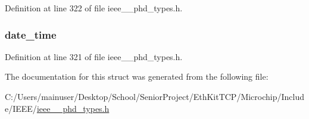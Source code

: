 Definition at line 322 of file ieee\+\_\+\_\+phd\+\_\+types.\+h.

\hypertarget{struct___set_time_invoke_a5220206765d190357de8a2604af4c4f4}{}
\subsubsection[{date\+\_\+time}]{ date\+\_\+time}\label{struct___set_time_invoke_a5220206765d190357de8a2604af4c4f4}


Definition at line 321 of file ieee\+\_\+\_\+phd\+\_\+types.\+h.



The documentation for this struct was generated from the following file\+:\begin{DoxyCompactItemize}
\item 
C\+:/\+Users/mainuser/\+Desktop/\+School/\+Senior\+Project/\+Eth\+Kit\+T\+C\+P/\+Microchip/\+Include/\+I\+E\+E\+E/\hyperlink{ieee__11073__phd__types_8h}{ieee\+\_\+\_\+phd\+\_\+types.\+h}\end{DoxyCompactItemize}
